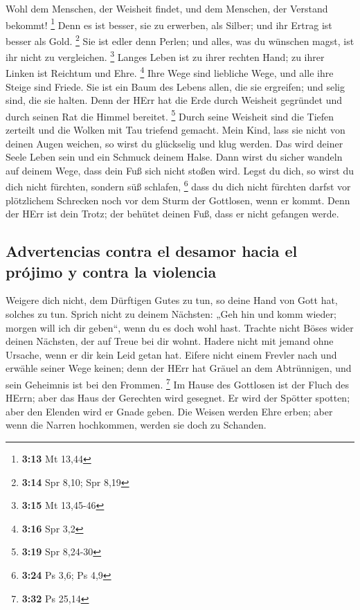 Wohl dem Menschen, der Weisheit findet, und dem
Menschen, der Verstand bekommt! \footnote{\textbf{3:13} Mt 13,44}
 Denn es ist besser, sie zu erwerben, als Silber; und ihr
Ertrag ist besser als Gold. \footnote{\textbf{3:14} Spr 8,10; Spr 8,19}
 Sie ist edler denn Perlen; und alles, was du wünschen
magst, ist ihr nicht zu vergleichen. \footnote{\textbf{3:15} Mt 13,45-46}
 Langes Leben ist zu ihrer rechten Hand; zu ihrer Linken
ist Reichtum und Ehre. \footnote{\textbf{3:16} Spr 3,2} 
Ihre Wege sind liebliche Wege, und alle ihre Steige sind Friede.
 Sie ist ein Baum des Lebens allen, die sie ergreifen;
und selig sind, die sie halten.  Denn der HErr hat die
Erde durch Weisheit gegründet und durch seinen Rat die Himmel bereitet.
\footnote{\textbf{3:19} Spr 8,24-30}  Durch seine
Weisheit sind die Tiefen zerteilt und die Wolken mit Tau triefend
gemacht.  Mein Kind, lass sie nicht von deinen Augen
weichen, so wirst du glückselig und klug werden.  Das
wird deiner Seele Leben sein und ein Schmuck deinem Halse.
 Dann wirst du sicher wandeln auf deinem Wege, dass dein
Fuß sich nicht stoßen wird.  Legst du dich, so wirst du
dich nicht fürchten, sondern süß schlafen, \footnote{\textbf{3:24} Ps
  3,6; Ps 4,9}  dass du dich nicht fürchten darfst vor
plötzlichem Schrecken noch vor dem Sturm der Gottlosen, wenn er kommt.
 Denn der HErr ist dein Trotz; der behütet deinen Fuß,
dass er nicht gefangen werde.

\hypertarget{advertencias-contra-el-desamor-hacia-el-pruxf3jimo-y-contra-la-violencia}{%
\subsection{Advertencias contra el desamor hacia el prójimo y contra la
violencia}\label{advertencias-contra-el-desamor-hacia-el-pruxf3jimo-y-contra-la-violencia}}

 Weigere dich nicht, dem Dürftigen Gutes zu tun, so deine
Hand von Gott hat, solches zu tun.  Sprich nicht zu
deinem Nächsten: „Geh hin und komm wieder; morgen will ich dir geben``,
wenn du es doch wohl hast.  Trachte nicht Böses wider
deinen Nächsten, der auf Treue bei dir wohnt.  Hadere
nicht mit jemand ohne Ursache, wenn er dir kein Leid getan hat.
 Eifere nicht einem Frevler nach und erwähle seiner Wege
keinen;  denn der HErr hat Gräuel an dem Abtrünnigen, und
sein Geheimnis ist bei den Frommen. \footnote{\textbf{3:32} Ps 25,14}
 Im Hause des Gottlosen ist der Fluch des HErrn; aber das
Haus der Gerechten wird gesegnet.  Er wird der Spötter
spotten; aber den Elenden wird er Gnade geben.  Die
Weisen werden Ehre erben; aber wenn die Narren hochkommen, werden sie
doch zu Schanden.

